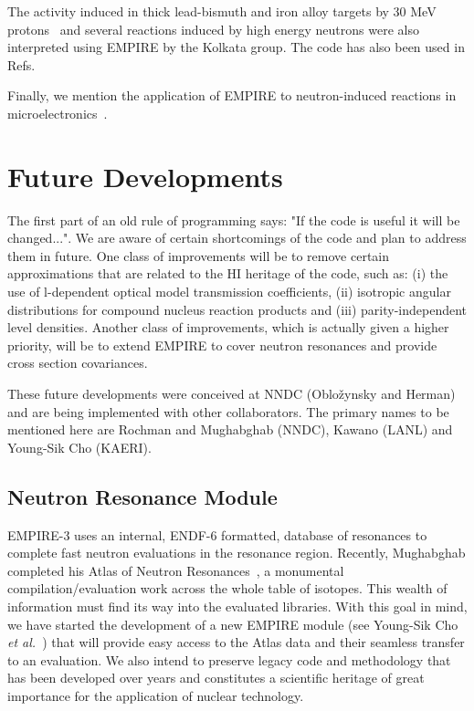 The activity induced in thick lead-bismuth and iron alloy targets by 30
MeV protons~\cite{Nandy:07a} and several reactions induced by high energy
neutrons were also interpreted using EMPIRE by the Kolkata group. The code
has also been used in Refs.~\cite{Said:06, Elmaghraby:06, Pandey:07}

Finally, we mention the application of EMPIRE to neutron-induced reactions in
microelectronics~\cite{wrobel2005unc}.

\section{Future Developments}

The first part of an old rule of programming says: "If the code is useful
it will be changed...". We are aware of certain shortcomings of the code
and plan to address them in future. One class of improvements will be
to remove certain approximations that are related to the HI heritage of the
code, such as: (i) the use
of l-dependent optical model transmission coefficients, (ii) isotropic
angular distributions for compound nucleus reaction products and (iii)
parity-independent level densities. Another class of improvements, which
is actually given a higher priority, will be to  extend EMPIRE to cover neutron
resonances and provide cross section covariances.

These future developments were conceived at NNDC (Oblo\v{z}ynsky and Herman)
and are being implemented with other collaborators. The primary
names to be mentioned here are Rochman and Mughabghab (NNDC), Kawano (LANL)
and Young-Sik Cho (KAERI).

\subsection{Neutron Resonance Module}

EMPIRE-3 uses an internal, ENDF-6 formatted, database of resonances to
complete fast neutron evaluations in the resonance region. Recently,
Mughabghab completed his Atlas of Neutron Resonances~\cite{Mughabghab:06}, a
monumental compilation/evaluation work across the whole table of isotopes.
This wealth of information must find its way into the evaluated libraries.
With this goal in mind, we have started the development of a new EMPIRE module
(see Young-Sik Cho \textit{et al.}~\cite{Cho:07}) that will provide easy
access to the Atlas data and their seamless transfer to an evaluation. We
also intend to preserve legacy code and methodology that has been developed
over years and constitutes a scientific heritage of great importance
for the application of nuclear technology.

